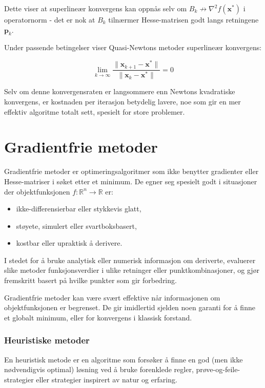 Dette viser at superlineær konvergens kan oppnås selv om \( B_k \not\to \nabla^2 f(\symbf{x}^\ast) \) i operatornorm - det er nok at \( B_k \) tilnærmer Hesse-matrisen godt langs retningene \( \symbf{p}_k \).

Under passende betingelser viser Quasi-Newtons metoder superlineær konvergens:

\[
	\lim_{k \to \infty} \frac{\|\symbf{x}_{k+1} - \symbf{x}^\ast\|}{\|\symbf{x}_k - \symbf{x}^\ast\|} = 0
\]

Selv om denne konvergensraten er langsommere enn Newtons kvadratiske konvergens, er kostnaden per iterasjon betydelig lavere, noe som gir en mer effektiv algoritme totalt sett, spesielt for store problemer.

\chapter{Gradientfrie metoder}
\label{sec:gradientfrie_metoder}

Gradientfrie metoder er optimeringsalgoritmer som ikke benytter gradienter eller Hesse-matriser i søket etter et minimum.
De egner seg spesielt godt i situasjoner der objektfunksjonen \( f : \mathbb{R}^n \to \mathbb{R} \) er:
\begin{itemize}
	\item ikke-differensierbar eller stykkevis glatt,
	\item støyete, simulert eller svartboksbasert,
	\item kostbar eller upraktisk å derivere.
\end{itemize}

I stedet for å bruke analytisk eller numerisk informasjon om deriverte, evaluerer slike metoder funksjonsverdier i ulike retninger eller punktkombinasjoner, og gjør fremskritt basert på hvilke punkter som gir forbedring.

Gradientfrie metoder kan være svært effektive når informasjonen om objektfunksjonen er begrenset. De gir imidlertid sjelden noen garanti for å finne et globalt minimum, eller for konvergens i klassisk forstand.

\subsection{Heuristiske metoder}

En heuristisk metode er en algoritme som forsøker å finne en god (men ikke nødvendigvis optimal) løsning ved å bruke forenklede regler, prøve-og-feile-strategier eller strategier inspirert av natur og erfaring.

